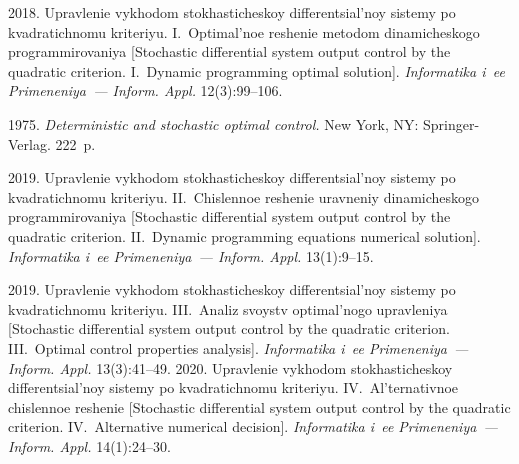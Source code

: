\vspace*{6pt}

  \begin{multicols}{2}

\renewcommand{\bibname}{\protect\rmfamily References}

{\small\frenchspacing
 {%
 \begin{thebibliography}{9}
      2018. Upravlenie vykhodom 
stokhasticheskoy differentsial'noy sistemy po kvadratichnomu kriteriyu. I.~Optimal'noe reshenie 
metodom dinamicheskogo programmirovaniya [Stochastic differential system output control by 
the quadratic criterion. I.~Dynamic programming optimal solution]. \textit{Informatika i~ee 
Primeneniya~--- Inform. Appl.} 12(3):99--106.
{

}

      1975. \textit{Deterministic and stochastic 
optimal control.} New York, NY: Springer-Verlag. 222~p.

      2019. Upravlenie vykhodom 
stokhasticheskoy differentsial'noy sistemy po kvadratichnomu kriteriyu. II.~Chislennoe reshenie 
uravneniy dinamicheskogo programmirovaniya [Stochastic differential system output control by 
the quadratic criterion. II.~Dynamic programming equations numerical solution]. 
\textit{Informatika i~ee Primeneniya~--- Inform. Appl.} 13(1):9--15.
{

}
      2019. Upravlenie vykhodom 
stokhasticheskoy differentsial'noy sistemy po kvadratichnomu kriteriyu. III.~Analiz svoystv 
optimal'nogo upravleniya [Stochastic differential system output control by the quadratic 
criterion. III.~Optimal control properties analysis]. \textit{Informatika i~ee Primeneniya~--- 
Inform. Appl.} 13(3):41--49.
      2020. Upravlenie vykhodom 
stokhasticheskoy differentsial'noy sistemy po kvadratichnomu kriteriyu. IV.~Al'ternativnoe 
chislennoe reshenie [Stochastic differential system output control by the quadratic criterion. 
IV.~Alternative numerical decision]. \textit{Informatika i~ee Primeneniya~--- Inform. Appl.} 
14(1):24--30.
{

}


\end{thebibliography}}}
\end{multicols}

